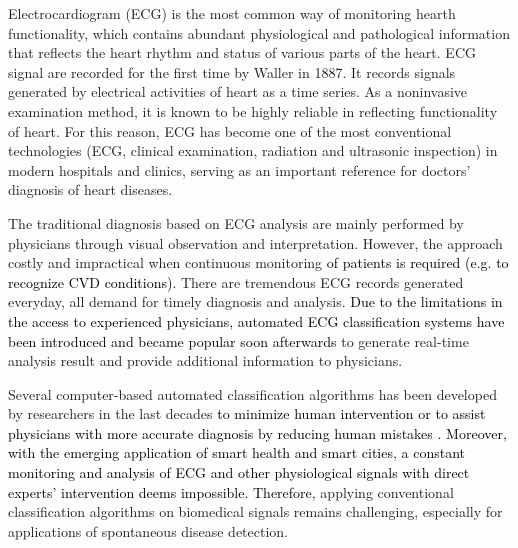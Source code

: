 Electrocardiogram (ECG) is the most common way of monitoring hearth functionality, which %
contains abundant physiological and pathological information that reflects the heart rhythm and status of various parts of the heart. ECG signal are recorded for the first time by Waller in 1887\cite{besterman1979waller}. %
It records signals generated by electrical activities of heart as a time series. As a noninvasive examination method, it is known to be highly reliable in reflecting functionality of heart. For this reason, ECG has become one of the most conventional technologies (ECG, clinical examination, radiation and ultrasonic inspection) in modern hospitals and clinics, serving as an important reference for doctors' diagnosis of heart diseases\cite{kreger1987electrocardiogram}.


The traditional diagnosis based on ECG analysis are mainly performed by physicians through visual observation and interpretation.%
However, the approach costly and impractical when continuous monitoring \textcolor{black}{of patients is required (e.g. to recognize CVD conditions).}%
There are tremendous ECG records generated everyday, all demand for timely diagnosis and analysis. %
\textcolor{black}{Due to the limitations in the access to experienced physicians, automated  ECG classification systems have been introduced and became popular soon afterwards} to generate real-time analysis result and provide additional information to physicians. 

Several computer-based automated classification algorithms has been developed by researchers in the last decades \textcolor{black}{to minimize human intervention or to assist physicians with more accurate diagnosis by reducing human mistakes \cite{lagerholm2000clustering, prasad2003classification, autofs, ceylan2009novel, osowski2004support, Hu_et_al,deChazal2006,llamedo2012automatic,bbnn,ince2009generic,Kiranyaz}.} \textcolor{black}{Moreover, with the emerging application of smart health and smart cities, a constant monitoring and analysis of ECG and other physiological signals with direct experts' intervention deems impossible. Therefore,} applying conventional classification algorithms on biomedical signals remains challenging, especially for applications of spontaneous disease detection. 


